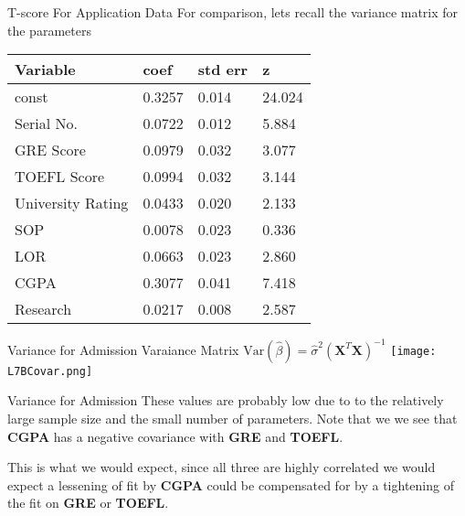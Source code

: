 \documentclass[10pt, table, dvipsnames,xcdraw, handout ]{beamer}
\newcommand{\bfX}{\ensuremath{\mathbf{X}}}
\begin{document}
\begin{frame}[fragile]{T-score For Application Data}
For comparison, lets recall the variance matrix for the parameters
\begin{table}[]
\begin{tabular}{llll}
\hline
\textbf{Variable} & \textbf{coef} & \multicolumn{1}{c}{\textbf{std err}} & \textbf{z} \\ \hline
const             & 0.3257        & 0.014                                & 24.024     \\
Serial No.        & 0.0722        & 0.012                                & 5.884      \\
GRE Score         & 0.0979        & 0.032                                & 3.077      \\
TOEFL Score       & 0.0994        & 0.032                                & 3.144      \\
University Rating & 0.0433        & 0.020                                & 2.133      \\
SOP               & 0.0078        & 0.023                                & 0.336      \\
LOR               & 0.0663        & 0.023                                & 2.860      \\
CGPA              & 0.3077        & 0.041                                & 7.418      \\
Research          & 0.0217        & 0.008                                & 2.587     
\end{tabular}
\end{table}

\end{frame}


\begin{frame}[fragile]{Variance for Admission}
Varaiance Matrix $\text{Var}(\hat\beta) = \hat\sigma^2 (\bfX^T\bfX)^{-1}$
	\centering \texttt{[image: L7BCovar.png]} 
\end{frame}



\begin{frame}[fragile]{Variance for Admission}
These values are probably low due to to the relatively large sample size and the small number of parameters. Note that we we see that \textbf{CGPA} has a negative covariance with \textbf{GRE} and \textbf{TOEFL}. \pause

This is what we would expect, since all three are highly correlated we would expect a lessening of fit by \textbf{CGPA} could be compensated for by a tightening of the fit on \textbf{GRE} or \textbf{TOEFL}. 
\end{frame}
\end{document}
